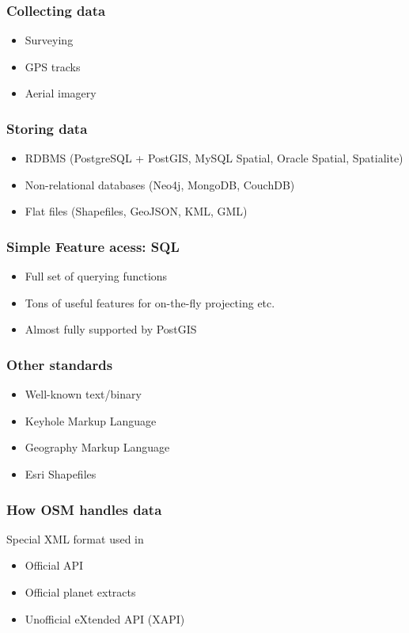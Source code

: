 \documentclass[17pt]{beamer}
\begin{document}
\begin{frame}
  \frametitle{Collecting data}
  \begin{itemize}
  \item Surveying
  \item GPS tracks
  \item Aerial imagery
  \end{itemize}
\end{frame}

\begin{frame}
  \frametitle{Storing data}
  \begin{itemize}
  \item RDBMS (PostgreSQL + PostGIS, MySQL Spatial, Oracle Spatial, Spatialite)
  \item Non-relational databases (Neo4j, MongoDB, CouchDB)
  \item Flat files (Shapefiles, GeoJSON, KML, GML)
  \end{itemize}
\end{frame}

\begin{frame}
  \frametitle{Simple Feature acess: SQL}
  \begin{itemize}
  \item Full set of querying functions
  \item Tons of useful features for on-the-fly projecting etc.
  \item Almost fully supported by PostGIS
  \end{itemize}
\end{frame}

\begin{frame}
  \frametitle{Other standards}
  \begin{itemize}
  \item Well-known text/binary
  \item Keyhole Markup Language
  \item Geography Markup Language
  \item Esri Shapefiles
  \end{itemize}
\end{frame}

\begin{frame}
  \frametitle{How OSM handles data}
  Special XML format used in
  \begin{itemize}
  \item Official API
  \item Official planet extracts
  \item Unofficial eXtended API (XAPI)
  \end{itemize}
\end{frame}
\end{document}
